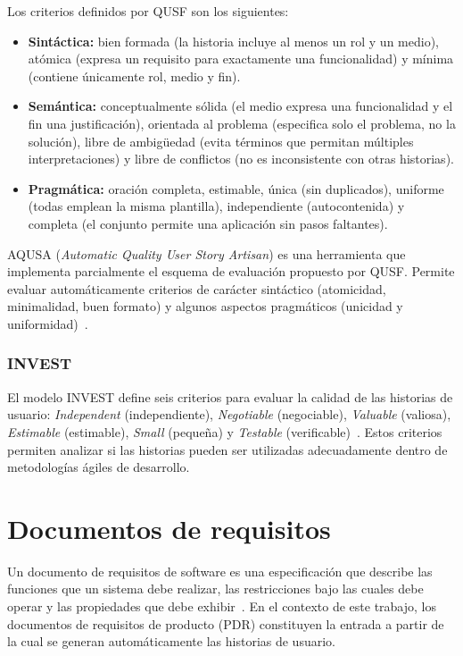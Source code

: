 Los criterios definidos por QUSF son los siguientes:

\begin{itemize}
  \item \textbf{Sintáctica:} bien formada (la historia incluye al menos un rol y un medio), atómica (expresa un requisito para exactamente una funcionalidad) y mínima (contiene únicamente rol, medio y fin).
  \item \textbf{Semántica:} conceptualmente sólida (el medio expresa una funcionalidad y el fin una justificación), orientada al problema (especifica solo el problema, no la solución), libre de ambigüedad (evita términos que permitan múltiples interpretaciones) y libre de conflictos (no es inconsistente con otras historias).
  \item \textbf{Pragmática:} oración completa, estimable, única (sin duplicados), uniforme (todas emplean la misma plantilla), independiente (autocontenida) y completa (el conjunto permite una aplicación sin pasos faltantes).
\end{itemize}

AQUSA (\textit{Automatic Quality User Story Artisan}) es una herramienta que implementa parcialmente el esquema de evaluación propuesto por QUSF. Permite evaluar automáticamente criterios de carácter sintáctico (atomicidad, minimalidad, buen formato) y algunos aspectos pragmáticos (unicidad y uniformidad)~\cite{aqusa-paper}.

\subsubsection{INVEST}
\label{sec:invest}

El modelo INVEST define seis criterios para evaluar la calidad de las historias de usuario: \textit{Independent} (independiente), \textit{Negotiable} (negociable), \textit{Valuable} (valiosa), \textit{Estimable} (estimable), \textit{Small} (pequeña) y \textit{Testable} (verificable)~\cite{wake_invest}. Estos criterios permiten analizar si las historias pueden ser utilizadas adecuadamente dentro de metodologías ágiles de desarrollo.

\section{Documentos de requisitos}
\label{sec:documentos_requisitos}

Un documento de requisitos de software es una especificación que describe las funciones que un sistema debe realizar, las restricciones bajo las cuales debe operar y las propiedades que debe exhibir~\cite{ieee830}. En el contexto de este trabajo, los documentos de requisitos de producto (PDR) constituyen la entrada a partir de la cual se generan automáticamente las historias de usuario.

